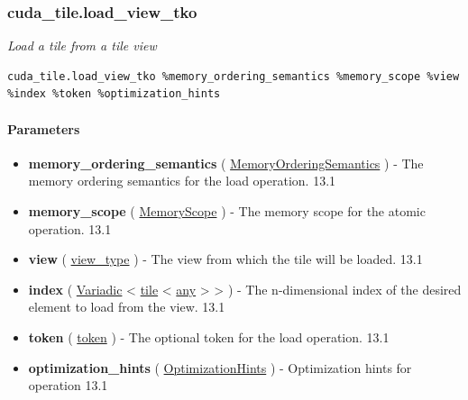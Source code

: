 \documentclass{article}
\begin{document}
\subsubsection{cuda\_tile.load\_view\_tko}

\textit{Load a tile from a tile view}


\begin{lstlisting}
cuda_tile.load_view_tko %memory_ordering_semantics %memory_scope %view %index %token %optimization_hints
\end{lstlisting}

\paragraph{Parameters}

\begin{itemize}
\item \textbf{memory\_ordering\_semantics} ( \href{https://docs.nvidia.com/cuda/tile-ir/latest/sections/operations.html#op-attribute-cuda-tile-load-view-tko-memoryorderingsemantics-attr}{MemoryOrderingSemantics} ) - The memory ordering semantics for the load operation. 13.1
\item \textbf{memory\_scope} ( \href{https://docs.nvidia.com/cuda/tile-ir/latest/sections/operations.html#op-attribute-cuda-tile-load-view-tko-memoryscope-attr}{MemoryScope} ) - The memory scope for the atomic operation. 13.1
\item \textbf{view} ( \href{https://docs.nvidia.com/cuda/tile-ir/latest/sections/operations.html#type-view-type}{view\_type} ) - The view from which the tile will be loaded. 13.1
\item \textbf{index} ( \href{https://docs.nvidia.com/cuda/tile-ir/latest/sections/operations.html#type-variadic}{Variadic} < \href{https://docs.nvidia.com/cuda/tile-ir/latest/sections/types.html#type-tile}{tile} < \href{https://docs.nvidia.com/cuda/tile-ir/latest/sections/operations.html#type-any}{any} > > ) - The n-dimensional index of the desired element to load from the view. 13.1
\item \textbf{token} ( \href{https://docs.nvidia.com/cuda/tile-ir/latest/sections/operations.html#type-token}{token} ) - The optional token for the load operation. 13.1
\item \textbf{optimization\_hints} ( \href{https://docs.nvidia.com/cuda/tile-ir/latest/sections/operations.html#op-attribute-cuda-tile-load-view-tko-optimizationhints-attr}{OptimizationHints} ) - Optimization hints for operation 13.1



\end{itemize}
\end{document}
